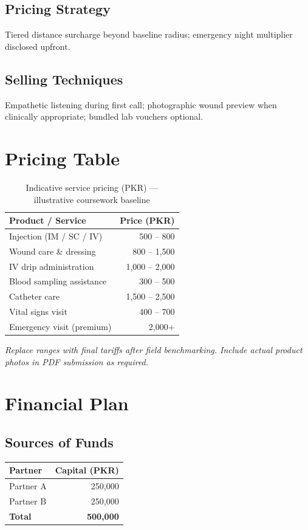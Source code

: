\documentclass[12pt,a4paper]{report}
\begin{document}
\section{Pricing Strategy}
Tiered distance surcharge beyond baseline radius; emergency night multiplier disclosed upfront.

\section{Selling Techniques}
Empathetic listening during first call; photographic wound preview when clinically appropriate; bundled lab vouchers optional.

\chapter{Pricing Table}

\begin{table}[h]
\centering
\caption{Indicative service pricing (PKR) --- illustrative coursework baseline}
\begin{tabular}{@{}l r@{}}
\toprule
\textbf{Product / Service} & \textbf{Price (PKR)} \\
\midrule
Injection (IM / SC / IV) & 500 -- 800 \\
Wound care \& dressing & 800 -- 1{,}500 \\
IV drip administration & 1{,}000 -- 2{,}000 \\
Blood sampling assistance & 300 -- 500 \\
Catheter care & 1{,}500 -- 2{,}500 \\
Vital signs visit & 400 -- 700 \\
Emergency visit (premium) & 2{,}000+ \\
\bottomrule
\end{tabular}
\end{table}

\noindent\textit{Replace ranges with final tariffs after field benchmarking. Include actual product photos in PDF submission as required.}

\chapter{Financial Plan}

\section{Sources of Funds}
\begin{table}[h]
\centering
\begin{tabular}{@{}l r@{}}
\toprule
\textbf{Partner} & \textbf{Capital (PKR)} \\
\midrule
Partner A & 250{,}000 \\
Partner B & 250{,}000 \\
\midrule
\textbf{Total} & \textbf{500{,}000} \\
\bottomrule
\end{tabular}
\end{table}
\end{document}
